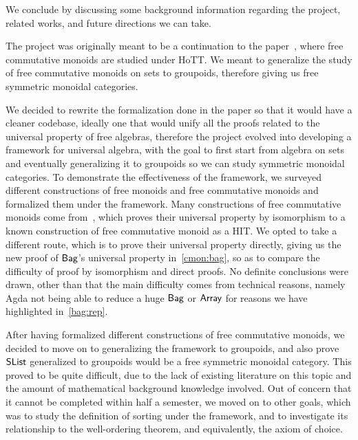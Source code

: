 \label{sec:discussion}

We conclude by discussing some background information regarding the project,
related works, and future directions we can take.

The project was originally meant to be a continuation to the
paper~\cite{choudhuryFreeCommutativeMonoids2023}, where
free commutative monoids are studied under HoTT. We meant to
generalize the study of free commutative monoids on sets to
groupoids, therefore giving us free symmetric monoidal categories.

We decided to rewrite the formalization done in the paper so that
it would have a cleaner codebase, ideally one that would unify
all the proofs related to the universal property of free algebras,
therefore the project evolved into developing a framework for
universal algebra, with the goal to first start from algebra on sets
and eventually generalizing it to groupoids so we can study
symmetric monoidal categories. To demonstrate the effectiveness
of the framework, we surveyed different constructions of free
monoids and free commutative monoids and formalized them under the
framework. Many constructions of free commutative monoids come
from~\cite{joramConstructiveFinalSemantics2023}, which proves
their universal property by isomorphism to a known construction
of free commutative monoid as a HIT. We opted to take a different route,
which is to prove their universal property directly, giving us the new
proof of $\operatorname{\mathsf{Bag}}$'s universal property in~\cref{cmon:bag}, so as to
compare the difficulty of proof by isomorphism and direct proofs.
No definite conclusions were drawn, other than that the main difficulty
comes from technical reasons, namely Agda not being able to reduce
a huge $\operatorname{\mathsf{Bag}}$ or $\operatorname{\mathsf{Array}}$ for reasons we have highlighted
in~\cref{bag:rep}.

After having formalized different constructions of free commutative monoids,
we decided to move on to generalizing the framework to groupoids, and
also prove $\operatorname{\mathsf{SList}}$ generalized to groupoids would be a free symmetric
monoidal category. This proved to be quite difficult, due to the lack
of existing literature on this topic and the amount of mathematical background
knowledge involved. Out of concern that it cannot be completed within
half a semester, we moved on to other goals, which was to study the
definition of sorting under the framework, and to investigate its relationship
to the well-ordering theorem, and equivalently, the axiom of choice.

